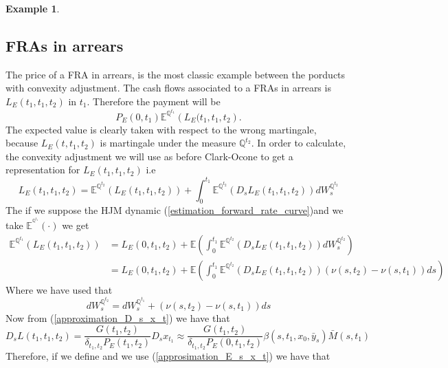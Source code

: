 \documentclass[a4paper,10pt]{article}
\newtheorem{example}[theorem]{Example}
\newcommand{\1}{\mathbf{1}}
\begin{document}
\begin{example}
 
\end{example}

\subsection{FRAs in arrears}
The price of a FRA in arrears, is the most classic example between the porducts with convexity adjustment. The cash flows associated to a FRAs in arrears is $L_{E}(t_1,t_1,t_2)$ in $t_1$. Therefore the payment will be
\begin{equation}
P_{E}(0,t_1)\mathbb{E}^{\mathbb{Q}^{t_1}}\left( L_{E}(t_1,t_1,t_2\right).
\end{equation}
The expected value is clearly taken with respect to the wrong martingale, because $L_{E}(t,t_1,t_2)$ is martingale under the measure $\mathbb{Q}^{t_2}$. In order to calculate, the convexity adjustment we will use as before Clark-Ocone to get a representation for $L_{E}(t_1,t_1,t_2)$ i.e
\begin{equation}\label{general_convexity_fras}
L_{E}(t_1,t_1,t_2) = \mathbb{E}^{\mathbb{Q}^{t_2}}\left(L_{E}(t_1,t_1,t_2) \right) + \int_{0}^{t_1} \mathbb{E}^{\mathbb{Q}^{t_2}}\left(D_s L_{E}(t_1,t_1,t_2) \right) dW^{\mathbb{Q}^{t_2}}_{s}
\end{equation}
The if we suppose the HJM dynamic (\ref{estimation_forward_rate_curve})and we take $\mathbb{E}^{^{\mathbb{Q}^{t_1}}}(\cdot)$ we get
\begin{align*}
\mathbb{E}^{\mathbb{Q}^{t_1}}\left(L_{E}(t_1,t_1,t_2) \right) &= L_{E}(0,t_1,t_2) + \mathbb{E}\left( \int_{0}^{t_1} \mathbb{E}^{\mathbb{Q}^{t_2}}\left(D_s L_{E}(t_1,t_1,t_2) \right) dW^{\mathbb{Q}^{t_2}}_{s}\right)\\
&= L_{E}(0,t_1,t_2) + \mathbb{E}\left( \int_{0}^{t_1} \mathbb{E}^{\mathbb{Q}^{t_2}}\left(D_s L_{E}(t_1,t_1,t_2) \right) (\nu(s,t_2)-\nu(s,t_1)) ds \right)
\end{align*}
Where we have used that 
\begin{equation*}
dW^{\mathbb{Q}^{t_2}}_s = dW^{\mathbb{Q}^{t_1}}_s + (\nu(s,t_2) - \nu(s,t_1)) ds 
\end{equation*}
Now from (\ref{approximation_D_s_x_t}) we have that 
\begin{equation*}
D_s L(t_1,t_1,t_2) = \frac{G(t_1,t_2)}{\delta_{t_1,t_2}P_{E}(t_1,t_2)} D_s x_{t_1} \approx \frac{G(t_1,t_2)}{\delta_{t_1,t_2}P_{E}(0,t_1,t_2)} \beta(s,t_1, x_0, \bar{y}_s)\bar{M}(s,t_1)
\end{equation*}
Therefore, if we define and we use (\ref{approsimation_E_s_x_t}) we have that
\end{document}
